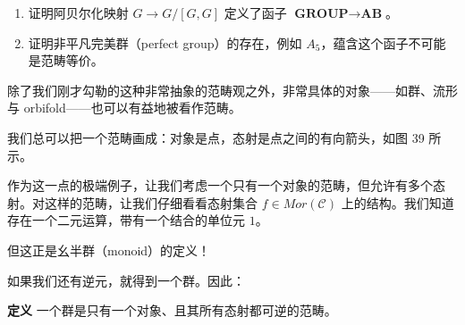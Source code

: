 \begin{enumerate}[label=\alph*.)]
  \item 证明阿贝尔化映射 $G\to G/[G,G]$ 定义了函子 $\textbf{GROUP}\to\textbf{AB}$。
  \item 证明非平凡完美群（perfect group）的存在，例如 $A_5$，蕴含这个函子不可能是范畴等价。
\end{enumerate}

除了我们刚才勾勒的这种非常抽象的范畴观之外，非常具体的对象——如群、流形与 orbifold——也可以有益地被看作范畴。

我们总可以把一个范畴画成：对象是点，态射是点之间的有向箭头，如图 39 所示。

作为这一点的极端例子，让我们考虑一个只有一个对象的范畴，但允许有多个态射。对这样的范畴，让我们仔细看看态射集合 $f\in\mathit{Mor}(\mathcal{C})$ 上的结构。我们知道存在一个二元运算，带有一个结合的单位元 $1$。

但这正是幺半群（monoid）的定义！

如果我们还有逆元，就得到一个群。因此：

\textbf{定义} 一个群是只有一个对象、且其所有态射都可逆的范畴。
